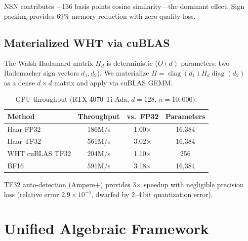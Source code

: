 \documentclass[letterpaper,11pt]{article}
\DeclareMathOperator{\diag}{diag}
\begin{document}
NSN contributes $+$136 basis points cosine similarity---the
dominant effect. Sign packing provides 69\% memory reduction
with zero quality loss.

\subsection{Materialized WHT via cuBLAS}

The Walsh-Hadamard matrix $H_d$ is deterministic ($O(d)$ parameters:
two Rademacher sign vectors $d_1, d_2$). We materialize
$\Pi = \diag(d_1) H_d \diag(d_2)$ as a dense $d \times d$ matrix
and apply via cuBLAS GEMM.

\begin{table}[ht]
\centering
\caption{GPU throughput (RTX 4070 Ti Ada, $d=128$, $n=10{,}000$).}
\label{tab:throughput}
\begin{tabular}{lccc}
\toprule
Method & Throughput & vs.\ FP32 & Parameters \\
\midrule
Haar FP32       & 186M/s  & 1.00$\times$ & 16{,}384 \\
Haar TF32       & 561M/s  & 3.02$\times$ & 16{,}384 \\
WHT cuBLAS TF32 & 204M/s  & 1.10$\times$ & 256 \\
BF16            & 591M/s  & 3.18$\times$ & 16{,}384 \\
\bottomrule
\end{tabular}
\end{table}

TF32 auto-detection (Ampere+) provides 3$\times$ speedup with
negligible precision loss (relative error $2.9 \times 10^{-4}$,
dwarfed by 2--4\,bit quantization error).

\section{Unified Algebraic Framework}
\label{sec:algebra}
\end{document}
